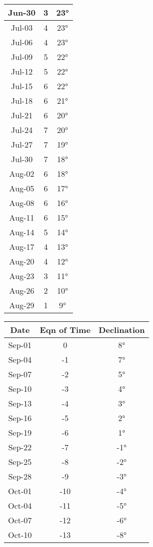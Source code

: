 \begin{footnotesize}
\begin{minipage}{0.33\textwidth}
\begin{tabular}[t]{c | c | c}
Jun-30 & 3 & 23°\\\hline
Jul-03 & 4 & 23°\\\hline
Jul-06 & 4 & 23°\\\hline
Jul-09 & 5 & 22°\\\hline
Jul-12 & 5 & 22°\\\hline
Jul-15 & 6 & 22°\\\hline
Jul-18 & 6 & 21°\\\hline
Jul-21 & 6 & 20°\\\hline
Jul-24 & 7 & 20°\\\hline
Jul-27 & 7 & 19°\\\hline
Jul-30 & 7 & 18°\\\hline
Aug-02 & 6 & 18°\\\hline
Aug-05 & 6 & 17°\\\hline
Aug-08 & 6 & 16°\\\hline
Aug-11 & 6 & 15°\\\hline
Aug-14 & 5 & 14°\\\hline
Aug-17 & 4 & 13°\\\hline
Aug-20 & 4 & 12°\\\hline
Aug-23 & 3 & 11°\\\hline
Aug-26 & 2 & 10°\\\hline
Aug-29 & 1 & 9°\\\hline
\end{tabular}\end{minipage}
\begin{minipage}{0.33\textwidth}
\begin{tabular}[t]{c | c | c}
Date&Eqn of Time&Declination\\\hline
Sep-01 & 0 & 8°\\\hline
Sep-04 & -1 & 7°\\\hline
Sep-07 & -2 & 5°\\\hline
Sep-10 & -3 & 4°\\\hline
Sep-13 & -4 & 3°\\\hline
Sep-16 & -5 & 2°\\\hline
Sep-19 & -6 & 1°\\\hline
Sep-22 & -7 & -1°\\\hline
Sep-25 & -8 & -2°\\\hline
Sep-28 & -9 & -3°\\\hline
Oct-01 & -10 & -4°\\\hline
Oct-04 & -11 & -5°\\\hline
Oct-07 & -12 & -6°\\\hline
Oct-10 & -13 & -8°\\\hline

\end{tabular}
\end{minipage}
\end{footnotesize}
